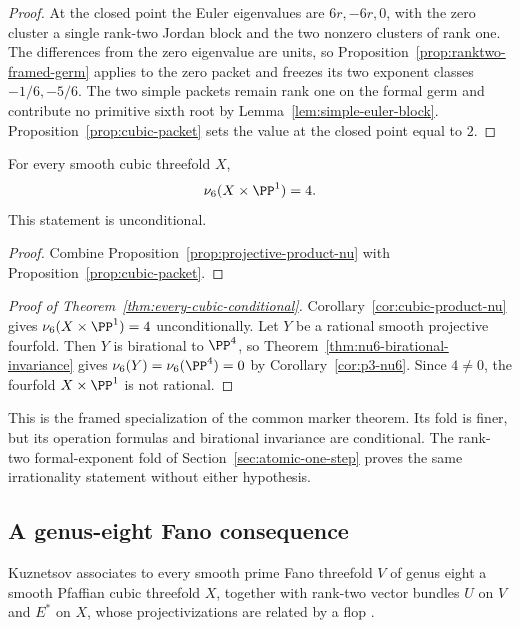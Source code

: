\begin{proof}
At the closed point the Euler eigenvalues are $6r,-6r,0$, with the zero
cluster a single rank-two Jordan block and the two nonzero clusters of rank
one.  The differences from the zero eigenvalue are units, so
Proposition~\ref{prop:ranktwo-framed-germ} applies to the zero packet and
freezes its two exponent classes $-1/6,-5/6$.  The two simple packets remain
rank one on the formal germ and contribute no primitive sixth root by
Lemma~\ref{lem:simple-euler-block}.  Proposition~\ref{prop:cubic-packet}
sets the value at the closed point equal to $2$.
\end{proof}

\begin{corollary}
\label{cor:cubic-product-nu}
%
%
For every smooth cubic threefold $X$,
\[
 \nu_6(X\times\PP^1)=4.
\]
This statement is unconditional.
\end{corollary}

\begin{proof}
Combine Proposition~\ref{prop:projective-product-nu} with
Proposition~\ref{prop:cubic-packet}.
\end{proof}

\begin{proof}[Proof of Theorem~\ref{thm:every-cubic-conditional}]
Corollary~\ref{cor:cubic-product-nu} gives \(\nu_6(X\times\PP^1)=4\)
unconditionally.  Let \(Y\) be a rational smooth projective fourfold.  Then
\(Y\) is birational to \(\PP^4\), so
Theorem~\ref{thm:nu6-birational-invariance} gives
\(\nu_6(Y)=\nu_6(\PP^4)=0\) by Corollary~\ref{cor:p3-nu6}.
Since \(4\ne0\), the fourfold \(X\times\PP^1\) is not rational.
\end{proof}

This is the framed specialization of the common marker theorem.  Its fold is
finer, but its operation formulas and birational invariance are conditional.
The rank-two formal-exponent fold of Section~\ref{sec:atomic-one-step} proves
the same irrationality statement without either hypothesis.

\subsection{A genus-eight Fano consequence}

Kuznetsov associates to every smooth prime Fano threefold \(V\) of genus
eight a smooth Pfaffian cubic threefold \(X\), together with rank-two vector
bundles \(U\) on \(V\) and \(E^*\) on \(X\), whose projectivizations are
related by a flop \cite[Theorems~2.17--2.18]{KuznetsovV14}.

